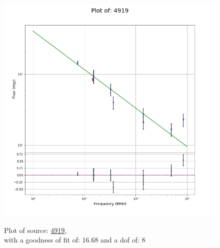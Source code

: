 \documentclass{article}
\begin{document}
\begin{figure}[H]
\begin{minipage}{0.5\textwidth}
        \includegraphics[scale = 0.35]{KmeulenSimSource_1hr/1hr4919.png}
        \captionsetup{labelformat=empty}
        \caption{Plot of source: \href{http://banana.transientskp.org/r4/vlo_KmeulenSimSource/runningcatalog/4919}{4919},\\with a goodness of fit of: 16.68 and a dof of: 8}
    \addtocounter{figure}{-1}
    \label{KmeulenSimSource:1hr:4919:plot}
    \end{minipage}
\end{figure}
\end{document}
